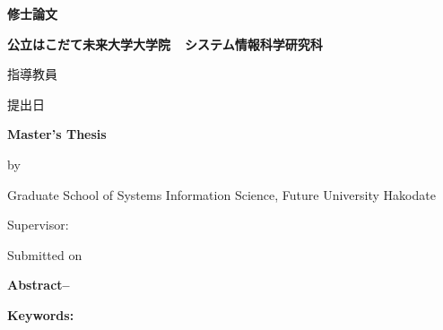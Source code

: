 \documentclass[uplatex, a4paper, report, 11pt, oneside]{jsbook}
\begin{document}
\thispagestyle{empty}
\vspace*{1.5truemm}
\begin{center}
    \LARGE\bfseries
    修士論文
\end{center}
\vspace*{2truemm}
\begin{center}
    \LARGE\bfseries\jtitle
\end{center}
\vspace*{2em}
\begin{center}
    \large\bfseries 公立はこだて未来大学大学院~~システム情報科学研究科\par%
    \jaffiliation
\end{center}
\vspace*{1em}
\begin{center}
    \Large\bfseries\jauthor
\end{center}
\vspace*{1em}
\begin{center}
    \large 指導教員~~~~\jadvisor\par
    \vspace{0.5em}
    \large 提出日~~~~\jdate
\end{center}
\vspace*{3em}
\begin{center}
\textbf{\Large Master's Thesis}\par
\vspace*{2em}
\textbf{\Large \etitle}\par
\vspace*{1em}
{\normalsize by}\par
\vspace*{1em}
{\large \eauthor}\par
\vspace*{1.5em}
Graduate School of Systems Information Science, Future University Hakodate \par
\eaffiliation

\normalsize Supervisor: \quad \eadvisor \par
\vspace*{2em}
Submitted on \edate
\end{center}

\newpage
\thispagestyle{empty}
\vspace*{30truemm}
\noindent
\textbf{Abstract--}~
\eabstract

\vspace*{1em}
\noindent
\textbf{Keywords:}~ 
\ekeywords
\end{document}

